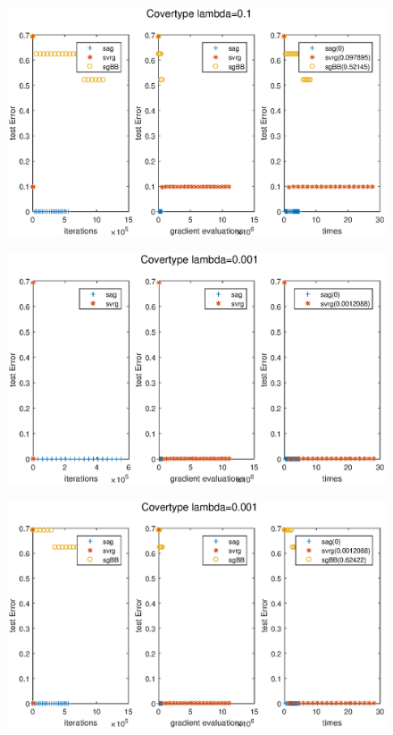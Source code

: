\documentclass[UTF8]{ctexart}
\begin{document}
\begin{figure}[htbp]
\centering\includegraphics[width=5in]{2-01-b.eps}
\label{fig:2-0.1-b}
\end{figure}
\begin{figure}[htbp]
\centering\includegraphics[width=5in]{2-0001-a.eps}
\label{fig:2-0.001-a}
\end{figure}
\begin{figure}[htbp]
\centering\includegraphics[width=5in]{2-0001-b.eps}
\label{fig:2-0.001-b}
\end{figure}
\end{document}

